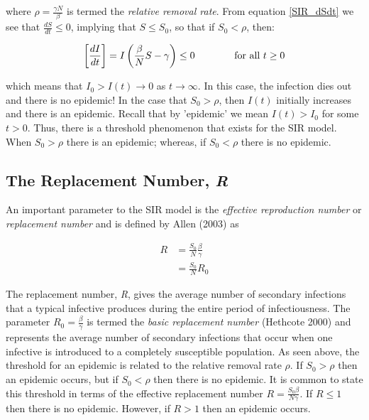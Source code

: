 \documentclass[reqno,11pt]{amsart}
\newcommand{\tab}{\hspace*{2em}}
\begin{document}
where $\rho = \frac{\gamma N}{\beta}$ is termed the \textit{relative removal rate}. From equation \eqref{SIR_dSdt} we see that $\frac{dS}{dt} \le 0$, implying that $S \le S_0$, so that if 
$S_0 < \rho $, then:

\begin{equation*}
\left [ \frac{dI}{dt} \right ] = I \left ( \frac{\beta}{N} S - \gamma \right ) \le 0 \text{\tab \tab for all $t \ge 0$} 
\end{equation*}


which means that $I_0 > I(t) \rightarrow 0$ as $t \rightarrow \infty$. In this case, the infection dies out and there is no epidemic! In the case that $S_0 > \rho $, then $I(t)$ initially increases and there is an epidemic. Recall that by 'epidemic' we mean $I(t) > I_0$ for some $t > 0$. Thus, there is a threshold phenomenon that exists for the SIR model. When $S_0 > \rho $ there is an epidemic; whereas, if $S_0 < \rho $ there is no epidemic.
%
%
%
%
\subsection{The Replacement Number, \textit{R}} An important parameter to the SIR model is the \textit{effective reproduction number} or \textit{replacement number} and is defined by Allen (2003) as

\begin{equation}
\begin{split}
    R& = \frac{S_0}{N}\frac{\beta}{\gamma} \\
      & = \frac{S_0}{N} R_0
\end{split}
\end{equation}

	The replacement number, \textit{R}, gives the average number of secondary infections that a typical infective produces during the entire period of infectiousness. The parameter $R_0  = \frac{\beta}{\gamma} $ is termed the \textit{basic replacement number} (Hethcote 2000) and represents the average number of secondary infections that occur when one infective is introduced to a completely susceptible population. As seen above, the threshold for an epidemic is related to the relative removal rate $\rho$. If $S_0 > \rho$ then an epidemic occurs, but if $S_0 < \rho$ then there is no epidemic. It is common to state this threshold in terms of the effective replacement number $R = \frac{S_0 \beta}{N \gamma} $. If $R \le 1$ then there is no epidemic. However, if $R > 1 $  then an epidemic occurs.
%
%
%
%
\end{document}
